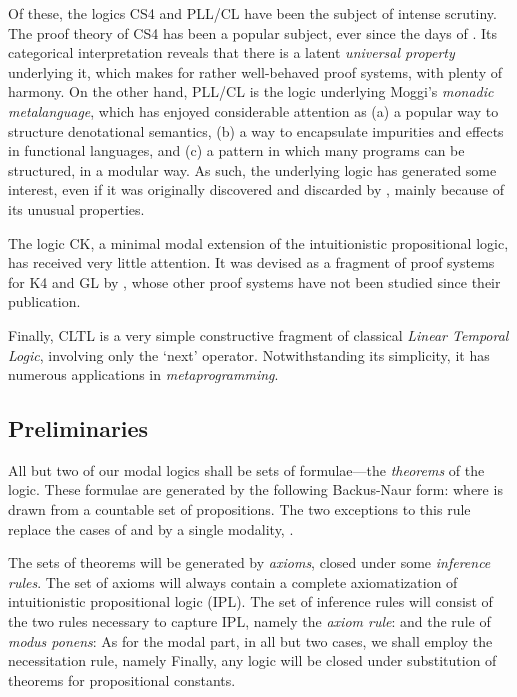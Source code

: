\documentclass[a4paper]{amsart}
\begin{document}
Of these, the logics \textsf{CS4} and \textsf{PLL}/\textsf{CL}
have been the subject of intense scrutiny. The proof theory of
\textsf{CS4} has been a popular subject, ever since the days of
\cite{Prawitz1965}. Its categorical interpretation reveals that
there is a latent \emph{universal property} underlying it, which
makes for rather well-behaved proof systems, with plenty of
harmony. On the other hand, \textsf{PLL}/\textsf{CL} is the logic
underlying Moggi's \emph{monadic metalanguage}, which has
enjoyed considerable attention as (a) a popular way to structure
denotational semantics, (b) a way to encapsulate impurities and
effects in functional languages, and (c) a pattern in which many
programs can be structured, in a modular way. As such, the
underlying logic has generated some interest, even if it was
originally discovered and discarded by \cite{Curry1952}, mainly
because of its unusual properties.

The logic \textsf{CK}, a minimal modal extension of the
intuitionistic propositional logic, has received very little
attention. It was devised as a fragment of proof systems for
\textsf{K4} and \textsf{GL} by \cite{Bellin1985}, whose other
proof systems have not been studied since their publication.

Finally, \textsf{CLTL} is a very simple constructive fragment of
classical \emph{Linear Temporal Logic}, involving only the `next'
operator. Notwithstanding its simplicity, it has numerous
applications in \emph{metaprogramming}.

\subsection{Preliminaries}

All but two of our modal logics  shall be sets of
formulae---the \emph{theorems} of the logic. These formulae are
generated by the following Backus-Naur form:  where  is drawn from a countable set of propositions. The
two exceptions to this rule replace the cases of  and
 by a single modality, .

The sets of theorems will be generated by \emph{axioms}, closed
under some \emph{inference rules}. The set of axioms will always
contain a complete axiomatization of intuitionistic propositional
logic (\textsf{IPL}). The set of inference rules will consist of
the two rules necessary to capture \textsf{IPL}, namely the
\emph{axiom rule}:  and the rule of \emph{modus ponens}:  As for the modal part, in all but two cases, we
shall employ the necessitation rule, namely  Finally, any logic  will be closed
under substitution of theorems for propositional constants.
\end{document}
